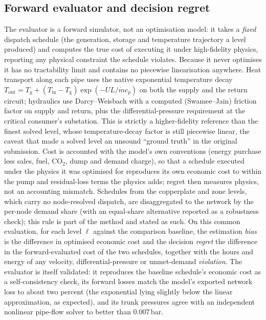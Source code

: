 \documentclass[a4paper,fleqn]{cas-sc}
\begin{document}
\subsection{Forward evaluator and decision regret}
\label{subsec:evaluator}
The evaluator is a forward simulator, not an optimisation model: it takes a \emph{fixed}
dispatch schedule (the generation, storage and temperature trajectory a level produced)
and computes the true cost of executing it under high-fidelity physics, reporting any physical
constraint the schedule violates. Because it never optimises it has no tractability limit and
contains no piecewise linearisation anywhere. Heat transport along each pipe uses the native
exponential temperature decay $T_\text{out}=T_\text{g}+(T_\text{in}-T_\text{g})\exp(-U L/\dot m
c_p)$ on both the supply and the return circuit; hydraulics use Darcy--Weisbach with a
computed (Swamee--Jain) friction factor on supply and return, plus the differential-pressure
requirement at the critical consumer's substation. This is strictly a higher-fidelity
reference than the finest solved level, whose temperature-decay factor is still piecewise
linear, the caveat that made a solved level an unsound ``ground truth'' in the original
submission. Cost is accounted with the model's own conventions (energy purchase less sales,
fuel, CO$_2$, dump and demand charge), so that a schedule executed under the physics it was
optimised for reproduces its own economic cost to within the pump and residual-loss terms
the physics adds; regret then measures physics, not an accounting mismatch. Schedules from the
copperplate and zone levels, which carry no node-resolved dispatch, are disaggregated to the
network by the per-node demand share (with an equal-share alternative reported as a
robustness check); this rule is part of the method and stated as such. On this common
evaluation, for each level $\ell$ against the comparison baseline, the estimation
\emph{bias} is the difference in optimised economic cost and the decision \emph{regret} the
difference in the forward-evaluated cost of the two schedules, together with the hours and
energy of any velocity, differential-pressure or unmet-demand \emph{violation}. The evaluator
is itself validated: it reproduces the baseline schedule's economic cost as a self-consistency
check, its forward losses match the model's exported network loss to about two percent (the
exponential lying slightly below the linear approximation, as expected), and its trunk
pressures agree with an independent nonlinear pipe-flow solver to better than $0.007$\,bar.
\end{document}
